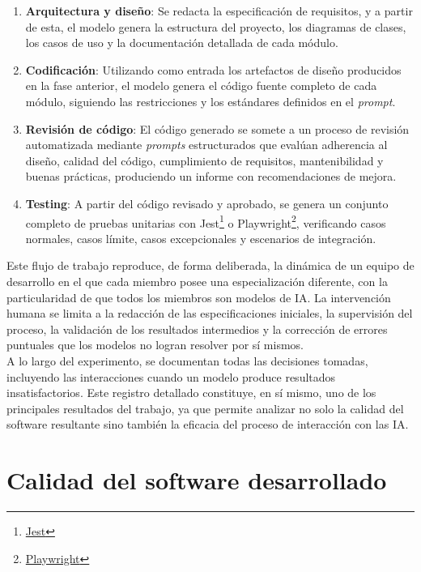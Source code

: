 \begin{enumerate}
  \item \textbf{Arquitectura y diseño}: Se redacta la especificación de requisitos, y a partir de esta, el modelo genera la estructura del proyecto, los diagramas de clases, los casos de uso y la documentación detallada de cada módulo.

  \item \textbf{Codificación}: Utilizando como entrada los artefactos de diseño producidos en la fase anterior, el modelo genera el código fuente completo de cada módulo, siguiendo las restricciones y los estándares definidos en el \textit{prompt}.

  \item \textbf{Revisión de código}: El código generado se somete a un proceso de revisión automatizada mediante \textit{prompts} estructurados que evalúan adherencia al diseño, calidad del código, cumplimiento de requisitos, mantenibilidad y buenas prácticas, produciendo un informe con recomendaciones de mejora.

  \item \textbf{Testing}: A partir del código revisado y aprobado, se genera un conjunto completo de pruebas unitarias con Jest\footnote{\href{https://jestjs.io}{Jest}} o Playwright\footnote{\href{https://playwright.dev}{Playwright}}, verificando casos normales, casos límite, casos excepcionales y escenarios de integración.
\end{enumerate}

Este flujo de trabajo reproduce, de forma deliberada, la dinámica de un equipo de desarrollo en el que cada miembro posee una especialización diferente, con la particularidad de que todos los miembros son modelos de \ac{IA}. La intervención humana se limita a la redacción de las especificaciones iniciales, la supervisión del proceso, la validación de los resultados intermedios y la corrección de errores puntuales que los modelos no logran resolver por sí mismos.\\

A lo largo del experimento, se documentan todas las decisiones tomadas, incluyendo las interacciones cuando un modelo produce resultados insatisfactorios. Este registro detallado constituye, en sí mismo, uno de los principales resultados del trabajo, ya que permite analizar no solo la calidad del software resultante sino también la eficacia del proceso de interacción con las \ac{IA}.

\section{Calidad del software desarrollado} \label{sec:calidad}


